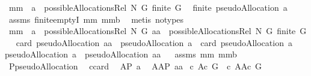 \begin{isabellebody}
%
\isadelimproof
\isanewline
%
\endisadelimproof
\isanewline
{}\isamarkupfalse%
\ mm{}{}{\isacharcolon}\ \ {\isachardoublequoteopen}a\ {\isasymin}\ possibleAllocationsRel\ N\ G{\isachardoublequoteclose}\ {\isachardoublequoteopen}finite\ G{\isachardoublequoteclose}\ \ \isanewline
{\isachardoublequoteopen}finite\ {\isacharparenleft}pseudoAllocation\ a{\isacharparenright}{\isachardoublequoteclose}%
\isadelimproof
\ %
\endisadelimproof
%
\isatagproof
{}\isamarkupfalse%
\ assms\ finite{\isachardot}emptyI\ mm{}{}\ mm{}{}b\ \isamarkupfalse%
\ {\isacharparenleft}metis\ {\isacharparenleft}no{\isacharunderscore}types{\isacharparenright}{\isacharparenright}%
\endisatagproof
{\isafoldproof}%
%
\isadelimproof
%
\endisadelimproof
\isanewline
\isanewline
{}\isamarkupfalse%
\ mm{}{}{\isacharcolon}\ \ {\isachardoublequoteopen}a\ {\isasymin}\ possibleAllocationsRel\ N\ G{\isachardoublequoteclose}\ {\isachardoublequoteopen}aa\ {\isasymin}\ possibleAllocationsRel\ N\ G{\isachardoublequoteclose}\ {\isachardoublequoteopen}finite\ G{\isachardoublequoteclose}\ \ \isanewline
{\isachardoublequoteopen}{\isacharparenleft}card\ {\isacharparenleft}pseudoAllocation\ aa\ {\isasyminter}\ {\isacharparenleft}pseudoAllocation\ a{\isacharparenright}{\isacharparenright}\ {\isacharequal}\ card\ {\isacharparenleft}pseudoAllocation\ a{\isacharparenright}{\isacharparenright}\ {\isacharequal}\ \isanewline
{\isacharparenleft}pseudoAllocation\ a\ {\isacharequal}\ pseudoAllocation\ aa{\isacharparenright}{\isachardoublequoteclose}%
\isadelimproof
\ %
\endisadelimproof
%
\isatagproof
{}\isamarkupfalse%
\ assms\ mm{}{}\ mm{}{}b\ \isanewline
{}\isamarkupfalse%
\ {\isacharminus}\isanewline
{}\isamarkupfalse%
\ {\isacharquery}P{\isacharequal}pseudoAllocation\ \isamarkupfalse%
\ {\isacharquery}c{\isacharequal}card\ \isamarkupfalse%
\ {\isacharquery}A{\isacharequal}{\isachardoublequoteopen}{\isacharquery}P\ a{\isachardoublequoteclose}\ \isamarkupfalse%
\ {\isacharquery}AA{\isacharequal}{\isachardoublequoteopen}{\isacharquery}P\ aa{\isachardoublequoteclose}\isanewline
{}\isamarkupfalse%
\ {\isachardoublequoteopen}{\isacharquery}c\ {\isacharquery}A{\isacharequal}{\isacharquery}c\ G\ {\isacharampersand}\ {\isacharquery}c\ {\isacharquery}AA{\isacharequal}{\isacharquery}c\ G{\isachardoublequoteclose}\ \isamarkupfalse%

\end{isabellebody}
